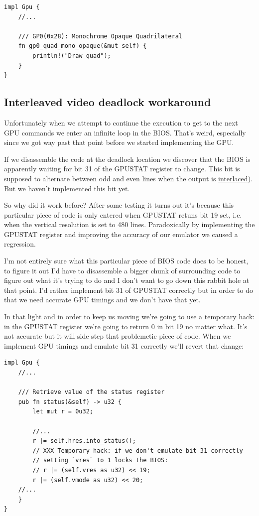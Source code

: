 \documentclass[a4paper]{article}
\begin{document}
\begin{lstlisting}
impl Gpu {
    //...

    /// GP0(0x28): Monochrome Opaque Quadrilateral
    fn gp0_quad_mono_opaque(&mut self) {
        println!("Draw quad");
    }
}
\end{lstlisting}

\subsection{Interleaved video deadlock workaround}

Unfortunately when we attempt to continue the execution to get to the
next GPU commands we enter an infinite loop in the BIOS. That's weird,
especially since we got way past that point before we started
implementing the GPU.

If we disassemble the code at the deadlock location we discover that
the BIOS is apparently waiting for bit 31 of the GPUSTAT register to
change. This bit is supposed to alternate between odd and even lines
when the output is
\href{https://en.wikipedia.org/wiki/Interlaced_video}{interlaced}). But
we haven't implemented this bit yet.

So why did it work before? After some testing it turns out it's
because this particular piece of code is only entered when GPUSTAT
retuns bit 19 set, i.e. when the vertical resolution is set to 480
lines. Paradoxically by implementing the GPUSTAT register and
improving the accuracy of our emulator we caused a regression.

I'm not entirely sure what this particular piece of BIOS code does to
be honest, to figure it out I'd have to disassemble a bigger chunk of
surrounding code to figure out what it's trying to do and I don't want
to go down this rabbit hole at that point. I'd rather implement bit
31 of GPUSTAT correctly but in order to do that we need accurate GPU
timings and we don't have that yet.

In that light and in order to keep us moving we're going to use a
temporary hack: in the GPUSTAT register we're going to return 0 in bit
19 no matter what. It's not accurate but it will side step that
problemetic piece of code. When we implement GPU timings and emulate
bit 31 correctly we'll revert that change:

\begin{lstlisting}
impl Gpu {
    //...

    /// Retrieve value of the status register
    pub fn status(&self) -> u32 {
        let mut r = 0u32;

        //...
        r |= self.hres.into_status();
        // XXX Temporary hack: if we don't emulate bit 31 correctly
        // setting `vres` to 1 locks the BIOS:
        // r |= (self.vres as u32) << 19;
        r |= (self.vmode as u32) << 20;
	//...
    }
}
\end{lstlisting}
\end{document}
